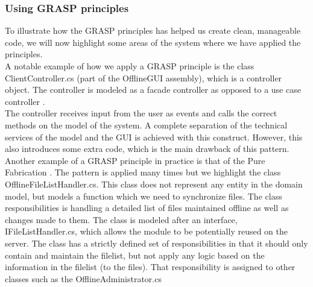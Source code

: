 \subsubsection{Using GRASP principles}
To illustrate how the GRASP principles has helped us create clean, manageable code, we will now highlight some areas of the system where we have applied the principles.\\
A notable example of how we apply a GRASP principle is the class ClientController.cs (part of the OfflineGUI assembly), which is a controller object. The controller is modeled as a facade controller as opposed to a use case controller \cite[p.~237]{OOAD}.\\
The controller receives input from the user as events and calls the correct methods on the model of the system. A complete separation of the technical services of the model and the GUI is achieved with this construct. However, this also introduces some extra code, which is the main drawback of this pattern.\\
\newline
Another example of a GRASP principle in practice is that of the Pure Fabrication \cite[p.~330]{OOAD}. The pattern is applied many times but we highlight the class OfflineFileListHandler.cs. This class does not represent any entity in the domain model, but models a function which we need to synchronize files. The class responsibilities is handling a detailed list of files maintained offline as well as changes made to them. The class is modeled after an interface, IFileListHandler.cs, which allows the module to be potentially reused on the server. The class has a strictly defined  set of responsibilities in that it should only contain and maintain the filelist, but not apply any logic based on the information in the filelist (to the files). That responsibility is assigned to other classes such as the OfflineAdministrator.cs\\
